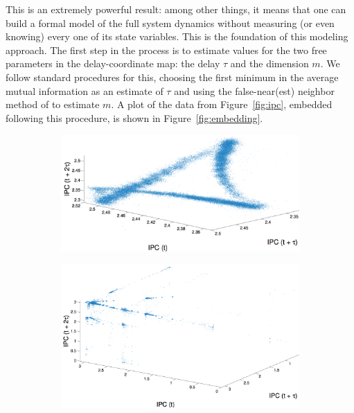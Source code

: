 This is an extremely powerful result: among other things, it means
that one can build a formal model of the full system dynamics without
measuring (or even knowing) every one of its state variables.  This is
the foundation of this modeling approach.
The first step in the process is to estimate values for the two free
parameters in the delay-coordinate map: the delay $\tau$ and the
dimension $m$.  We follow standard procedures for this, choosing the
first minimum in the average mutual information as an estimate of
$\tau$ \cite{fraser-swinney} and using the false-near(est) neighbor
method of \cite{KBA92} to estimate $m$.  A
plot of the data from Figure~\ref{fig:ipc}, embedded following this
procedure, is shown in Figure~\ref{fig:embedding}.


 \begin{figure}
   \centering
\begin{subfigure}{0.32\textwidth}
    \includegraphics[width=\textwidth]{figs/colipc3d.png}
    \caption{\col }
    \label{fig:colEmbedding}
  \end{subfigure}%
  \begin{subfigure}{0.32\textwidth}
    \includegraphics[width=\textwidth]{figs/svd53dipc.png}

\end{subfigure}
\end{figure}
